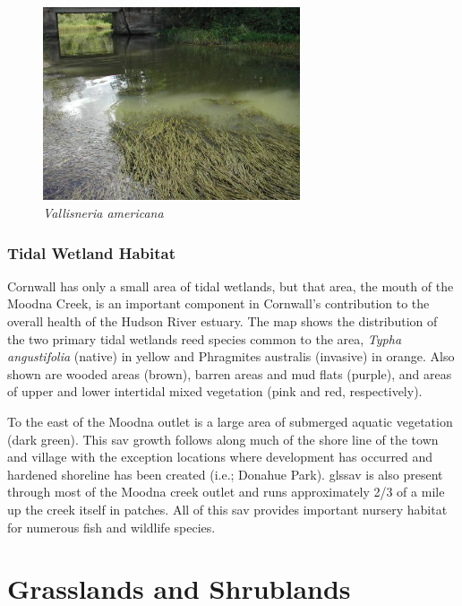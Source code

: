 \begin{figure}
    \includegraphics[width=7.6cm,keepaspectratio]{images/Water_Celery.jpg}
    \caption{\textit{Vallisneria americana}}
\end{figure}

\subsection*{Tidal Wetland Habitat}
Cornwall has only a small area of tidal wetlands, but that area, the mouth of
the Moodna Creek, is an important component in Cornwall’s contribution to the
overall health of the Hudson River estuary. The map shows the distribution of
the two primary tidal wetlands reed species common to the area, \textit{Typha
angustifolia} (native) in yellow and Phragmites australis (invasive) in orange.
Also shown are wooded areas (brown), barren areas and mud flats (purple), and
areas of upper and lower intertidal mixed vegetation (pink and red,
respectively).

To the east of the Moodna outlet is a large area of submerged aquatic vegetation 
(dark green). This \gls{sav} growth follows along much of the shore line of the 
town and village with the exception locations where development has occurred and 
hardened shoreline has been created (i.e.; Donahue Park). gls{sav} is also 
present through most of the Moodna creek outlet and runs approximately 2/3 of a 
mile up the creek itself in patches. All of this \gls{sav} provides important 
nursery habitat for numerous fish and wildlife species.

\chapter{Grasslands and Shrublands}\label{subsec:grasslandsandshrublands}
